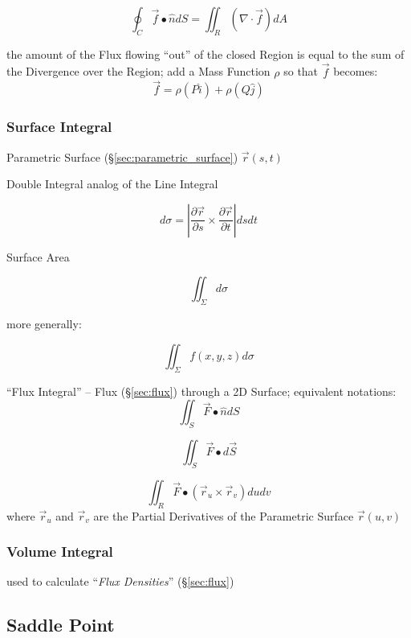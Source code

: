 \[
  \oint_C \vec{f} \bullet \hat{n} dS = \iint_R (\nabla \cdot \vec{f}) dA
\]

the amount of the Flux flowing ``out'' of the closed Region is equal to the sum
of the Divergence over the Region; add a Mass Function $\rho$ so that $\vec{f}$
becomes:
\[
  \vec{f} = \rho(P\hat{i}) + \rho(Q\hat{j})
\]



\subsubsection{Surface Integral}\label{sec:surface_integral}

Parametric Surface (\S\ref{sec:parametric_surface})
$\vec{r}(s,t)$

Double Integral analog of the Line Integral

\[
  d\sigma =
    |\frac{\partial{\vec{r}}}{\partial{s}}
      \times \frac{\partial{\vec{r}}}{\partial{t}}| ds dt
\]

Surface Area

\[
  {\iint}_{\Sigma} d\sigma
\]

more generally:

\[
  {\iint}_{\Sigma} f(x,y,z) d\sigma
\]

``Flux Integral'' -- Flux (\S\ref{sec:flux}) through a 2D Surface; equivalent
notations:
\[
  \iint_{S} \vec{F} \bullet \hat{n} dS
\]

\[
  \iint_{S} \vec{F} \bullet d\vec{S}
\]

\[
  \iint_{R} \vec{F} \bullet (\vec{r}_u \times \vec{r}_v) du dv
\]
where $\vec{r}_u$ and $\vec{r}_v$ are the Partial Derivatives of the Parametric
Surface $\vec{r}(u,v)$



\subsubsection{Volume Integral}\label{sec:volume_integral}

used to calculate ``\emph{Flux Densities}'' (\S\ref{sec:flux}) %



\subsection{Saddle Point}\label{sec:saddle_point}

